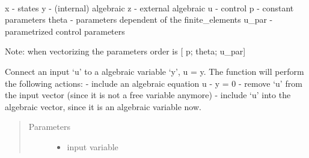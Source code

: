 \documentclass[letterpaper,10pt,english]{sphinxmanual}
\begin{document}
\begin{fulllineitems}
\label{\detokenize{yaocptool.modelling:yaocptool.modelling.system_model.SystemModel}}~

\begin{fulllineitems}
\label{\detokenize{yaocptool.modelling:yaocptool.modelling.system_model.SystemModel.__init__}}
x - states
y - (internal) algebraic
z - external algebraic
u - control
p - constant parameters
theta - parameters dependent of the finite\_elements
u\_par - parametrized control parameters

Note: when vectorizing the parameters order is {[} p; theta; u\_par{]}

\end{fulllineitems}


\begin{fulllineitems}
\label{\detokenize{yaocptool.modelling:yaocptool.modelling.system_model.SystemModel.all_sym}}
\end{fulllineitems}


\begin{fulllineitems}
\label{\detokenize{yaocptool.modelling:yaocptool.modelling.system_model.SystemModel.connect}}
Connect an input ‘u’ to a algebraic variable ‘y’, u = y.
The function will perform the following actions:
- include an algebraic equation u - y = 0
- remove ‘u’ from the input vector (since it is not a free variable anymore)
- include ‘u’ into the algebraic vector, since it is an algebraic variable now.
\begin{quote}\begin{description}
\item[{Parameters}] \leavevmode\begin{itemize}
\item {} 
 \textendash{} input variable


\end{itemize}
\end{description}
\end{quote}
\end{fulllineitems}
\end{fulllineitems}
\end{document}
